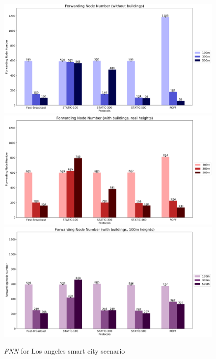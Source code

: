 	\begin{figure}[H]
		\centering
		\includegraphics[width=1.0\textwidth]{immagini/la-smart-city/b0/fnn}
		\includegraphics[width=1.0\textwidth]{immagini/la-smart-city/b1/h0/fnn}
		\includegraphics[width=1.0\textwidth]{immagini/la-smart-city/b1//h1/fnn}
		\caption{\textit{FNN} for Los angeles smart city scenario}
		\label{fig:la-smart-city-fnn}
	\end{figure}


